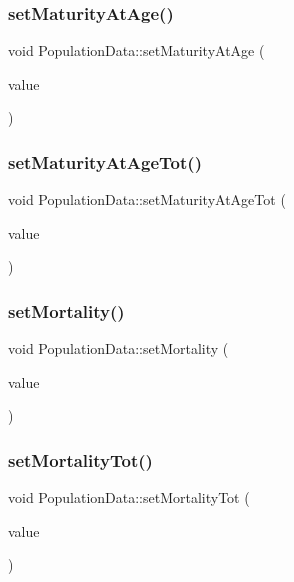 \subsubsection{\texorpdfstring{setMaturityAtAge()}{setMaturityAtAge()}}
{\footnotesize\ttfamily void Population\+Data\+::set\+Maturity\+At\+Age (\begin{DoxyParamCaption}\item[{const Q\+Vector$<$ double $>$ \&}]{value }\end{DoxyParamCaption})}

\mbox{\label{class_population_data_a81b1575deb521ecbcd6f2e466720b22e}} 
\subsubsection{\texorpdfstring{setMaturityAtAgeTot()}{setMaturityAtAgeTot()}}
{\footnotesize\ttfamily void Population\+Data\+::set\+Maturity\+At\+Age\+Tot (\begin{DoxyParamCaption}\item[{double}]{value }\end{DoxyParamCaption})}

\mbox{\label{class_population_data_a8bd49759a0cf33b3954cb51633d7eded}} 
\subsubsection{\texorpdfstring{setMortality()}{setMortality()}}
{\footnotesize\ttfamily void Population\+Data\+::set\+Mortality (\begin{DoxyParamCaption}\item[{const Q\+Vector$<$ double $>$ \&}]{value }\end{DoxyParamCaption})}

\mbox{\label{class_population_data_a7d9680fd6b96b2660500058b78bb85bc}} 
\subsubsection{\texorpdfstring{setMortalityTot()}{setMortalityTot()}}
{\footnotesize\ttfamily void Population\+Data\+::set\+Mortality\+Tot (\begin{DoxyParamCaption}\item[{double}]{value }\end{DoxyParamCaption})}

